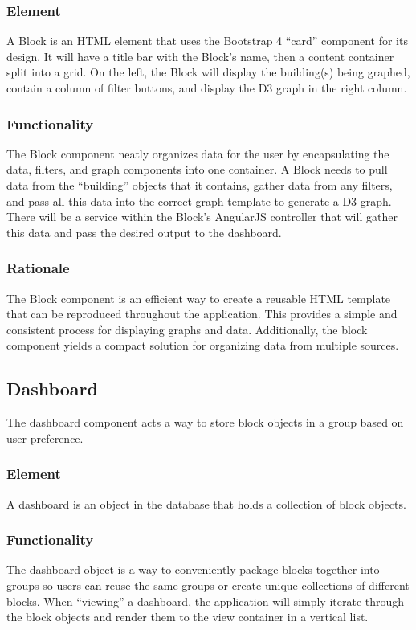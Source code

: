 \documentclass[journal,10pt,onecolumn,compsoc]{IEEEtran}
\begin{document}
			\subsubsection{Element} 
				A Block is an HTML element that uses the Bootstrap 4 ``card'' component for its design. It will have a title bar with the Block's name, then a content container split into a grid. 
				On the left, the Block will display the building(s) being graphed, contain a column of filter buttons, and display the D3 graph in the right column. 
			\subsubsection{Functionality}
				The Block component neatly organizes data for the user by encapsulating the data, filters, and graph components into one container. 
				A Block needs to pull data from the ``building'' objects that it contains, gather data from any filters, and pass all this data into the correct graph template to generate a D3 graph. 
				There will be a service within the Block's AngularJS controller that will gather this data and pass the desired output to the dashboard.
			\subsubsection{Rationale} 
				The Block component is an efficient way to create a reusable HTML template that can be reproduced throughout the application. 
				This provides a simple and consistent process for displaying graphs and data. Additionally, the block component yields a compact solution for organizing data from multiple sources. 
		
		\subsection{Dashboard}
			The dashboard component acts a way to store block objects in a group based on user preference.
			\subsubsection{Element} 
				A dashboard is an object in the database that holds a collection of block objects.
			\subsubsection{Functionality}
				The dashboard object is a way to conveniently package blocks together into groups so users can reuse the same groups or create unique collections of different blocks. 
				When ``viewing'' a dashboard, the application will simply iterate through the block objects and render them to the view container in a vertical list.
\end{document}
